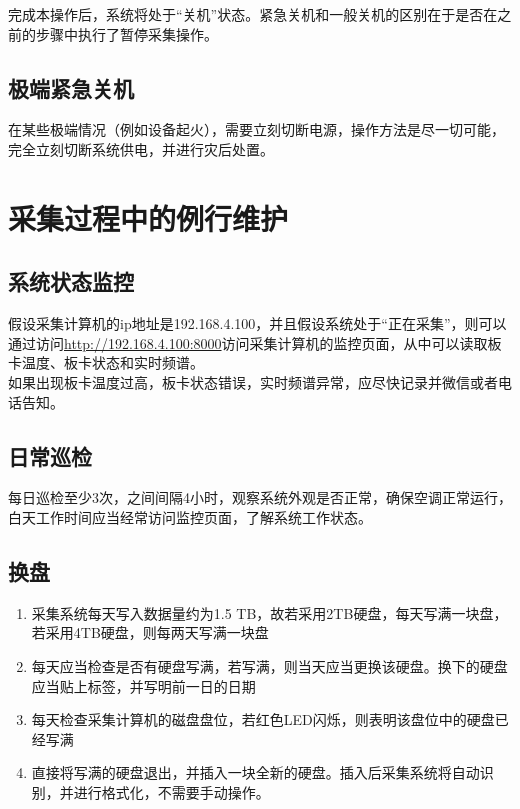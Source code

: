 \documentclass[11pt,includemp,a4paper]{article}
\begin{document}
完成本操作后，系统将处于“关机”状态。紧急关机和一般关机的区别在于是否在之前的步骤中执行了暂停采集操作。

\subsection{极端紧急关机}
在某些极端情况（例如设备起火），需要立刻切断电源，操作方法是尽一切可能，完全立刻切断系统供电，并进行灾后处置。

\section{采集过程中的例行维护}
\subsection{系统状态监控}
假设采集计算机的ip地址是192.168.4.100，并且假设系统处于“正在采集”，则可以通过访问\url{http://192.168.4.100:8000}访问采集计算机的监控页面，从中可以读取板卡温度、板卡状态和实时频谱。\\
如果出现板卡温度过高，板卡状态错误，实时频谱异常，应尽快记录并微信或者电话告知。

\subsection{日常巡检}
每日巡检至少3次，之间间隔4小时，观察系统外观是否正常，确保空调正常运行，白天工作时间应当经常访问监控页面，了解系统工作状态。

\subsection{换盘}
\begin{enumerate}
    \item 采集系统每天写入数据量约为1.5 TB，故若采用2TB硬盘，每天写满一块盘，若采用4TB硬盘，则每两天写满一块盘
    \item 每天应当检查是否有硬盘写满，若写满，则当天应当更换该硬盘。换下的硬盘应当贴上标签，并写明前一日的日期
    \item 每天检查采集计算机的磁盘盘位，若红色LED闪烁，则表明该盘位中的硬盘已经写满
    \item 直接将写满的硬盘退出，并插入一块全新的硬盘。插入后采集系统将自动识别，并进行格式化，不需要手动操作。
\end{enumerate}
\end{document}
